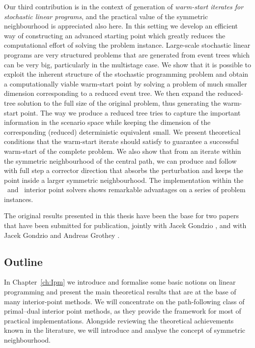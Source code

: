 Our third contribution is in the context of generation of 
{\em warm-start iterates for stochastic linear programs}, 
and the practical value of the 
symmetric neighbourhood is appreciated also here.
In this setting we develop an efficient way of constructing 
an advanced starting point which greatly reduces the computational
effort of solving the problem instance.
Large-scale stochastic linear programs are very structured problems
that are generated from event trees which can be very big, particularly
in the multistage case.
We show that it is possible to exploit the inherent structure of 
the stochastic programming problem and obtain a computationally viable
warm-start point by solving a problem of much smaller
dimension corresponding to a reduced event tree.
We then expand the reduced-tree solution to the full size of
the original problem, thus generating the warm-start point.
The way we produce a reduced tree tries to capture the 
important information in the scenario space while keeping 
the dimension of the corresponding (reduced) deterministic equivalent small.
We present theoretical conditions that the warm-start iterate
should satisfy to guarantee a successful warm-start of the complete 
problem. 
We also show that from an iterate within the symmetric neighbourhood
of the central path, we can produce and follow with full step 
a corrector direction that absorbs the perturbation and 
keeps the point inside a larger symmetric neighbourhood.
The implementation within the \HOPDM\ and \OOPS\ interior point solvers 
shows remarkable advantages on a series of problem instances.

The original results presented in this thesis have been the base for two
papers that have been submitted for publication, jointly with
Jacek Gondzio \cite{ColomboGondzio05}, and with Jacek Gondzio and 
Andreas Grothey \cite{ColomboGondzioGrothey06}.

%
%
\subsection{Outline}

In Chapter~\ref{ch:Ipm} we introduce and formalise some basic
notions on linear programming and present the main theoretical results 
that are at the base of many interior-point methods. 
We will concentrate on the path-following class of
primal--dual interior point methods, as they provide the framework for 
most of practical implementations.
Alongside reviewing the theoretical achievements known in the
literature, we will introduce and analyse the concept of 
symmetric neighbourhood.

